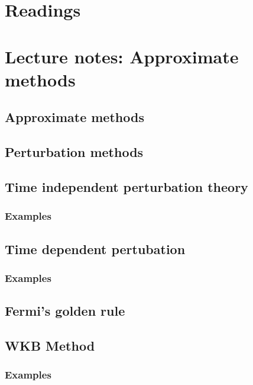 \part{Readings}
   

\part{Lecture notes: Approximate methods}
   \chapter{Approximate methods}
      
   \chapter{Perturbation methods}
      
   \chapter{Time independent perturbation theory}
      
      
      
      \section{Examples}
         
            \shipoutAnswer
   \chapter{Time dependent pertubation}
      
      
      
      
      
      \section{Examples}
         
            \shipoutAnswer
   \chapter{Fermi's golden rule}
      
      
   \chapter{WKB Method}
      
      \section{Examples}
         
            \shipoutAnswer

